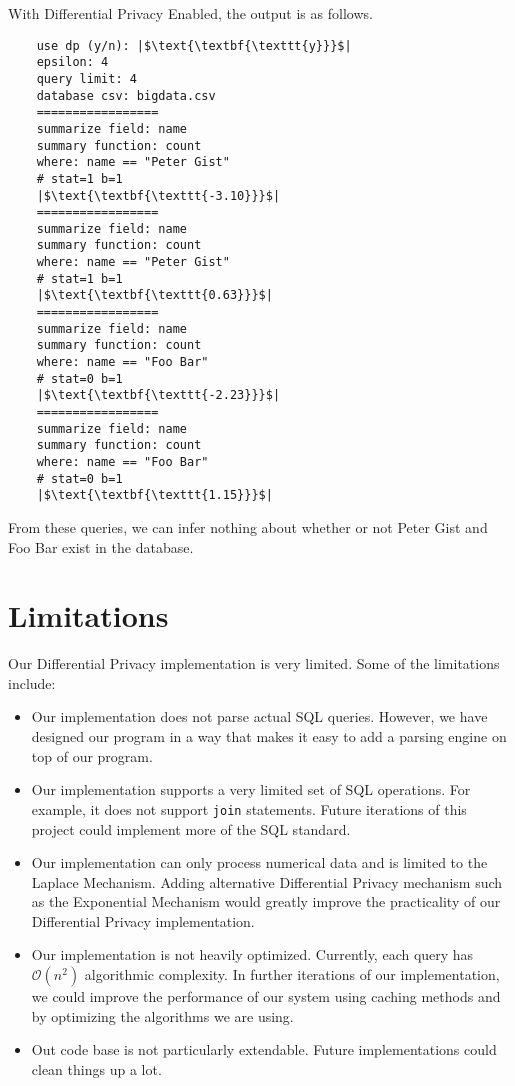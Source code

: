 \documentclass[conference,11pt]{IEEEtran}
\begin{document}
With Differential Privacy Enabled, the output is as follows.
\begin{verbatim}
    use dp (y/n): |$\text{\textbf{\texttt{y}}}$|
    epsilon: 4
    query limit: 4
    database csv: bigdata.csv
    =================
    summarize field: name
    summary function: count
    where: name == "Peter Gist"
    # stat=1 b=1
    |$\text{\textbf{\texttt{-3.10}}}$|
    =================
    summarize field: name
    summary function: count
    where: name == "Peter Gist"
    # stat=1 b=1
    |$\text{\textbf{\texttt{0.63}}}$|
    =================
    summarize field: name
    summary function: count
    where: name == "Foo Bar"
    # stat=0 b=1
    |$\text{\textbf{\texttt{-2.23}}}$|
    =================
    summarize field: name
    summary function: count
    where: name == "Foo Bar"
    # stat=0 b=1
    |$\text{\textbf{\texttt{1.15}}}$|
\end{verbatim}
From these queries, we can infer nothing about whether or not Peter Gist and
Foo Bar exist in the database.

\section{Limitations}\label{sec:limitations}
Our Differential Privacy implementation is very limited. Some of the limitations
include:
\begin{itemize}
    \item Our implementation does not parse actual SQL queries. However, we
        have designed our program in a way that makes it easy to add a parsing
        engine on top of our program.
    \item Our implementation supports a very limited set of SQL operations. For
        example, it does not support \texttt{join} statements.  Future
        iterations of this project could implement more of the SQL standard.
    \item Our implementation can only process numerical data and is limited to
        the Laplace Mechanism. Adding alternative Differential Privacy mechanism
        such as the Exponential Mechanism would greatly improve the practicality
        of our Differential Privacy implementation.
    \item Our implementation is not heavily optimized. Currently, each query has
        $\mathcal{O}(n^2)$ algorithmic complexity. In further iterations of our
        implementation, we could improve the performance of our system using
        caching methods and by optimizing the algorithms we are using.
   \item Out code base is not particularly extendable. Future implementations
        could clean things up a lot.
\end{itemize}
\end{document}
